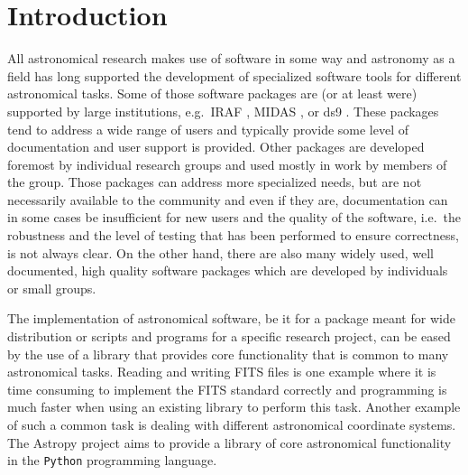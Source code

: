 \documentclass[modern]{aastex61}
\newcommand{\package}[1]{\texttt{#1}\xspace}
\newcommand{\python}{\package{Python}\xspace}
\newcommand{\astropy}{Astropy\xspace}
\begin{document}
\section{Introduction} \label{sec:intro}
All astronomical research makes use of software in some way and
astronomy as a field has long supported the development of specialized
software tools for different astronomical tasks. Some of those
software packages are (or at least were) supported by large
institutions, e.g.\ IRAF \citep[developed at NOAO,][]{IRAF}, MIDAS
\citep[developed at ESO,][]{MIDAS}, or ds9 \citep[developed at
%
%
  SAO,][]{ds9}. These packages tend to address a wide range of users
and typically provide some level of documentation and user
support is provided. Other packages are developed foremost by individual research
groups and used mostly in work by members of the group. Those
packages can address more specialized needs, but are not necessarily
available to the community and even if they are, documentation can in
some cases be insufficient for new users and the quality of the
software, i.e.\ the robustness and the level of testing that has been
performed to ensure correctness, is not always clear. On the other
hand, there are also many widely used, well documented, high quality
software packages which are developed by individuals or small groups.

The implementation of astronomical software, be it for a package meant
for wide distribution or scripts and programs for a specific research
project, can be eased by the use of a library that provides core
functionality that is common to many astronomical tasks. Reading and
writing FITS files is one example where it is time
consuming to implement the FITS standard correctly and
programming is much faster when using an existing library to perform this
task. Another example of such a common task is dealing with different
astronomical coordinate systems. The \astropy project aims to provide a
library of core astronomical functionality in the \python programming
language.
\end{document}
